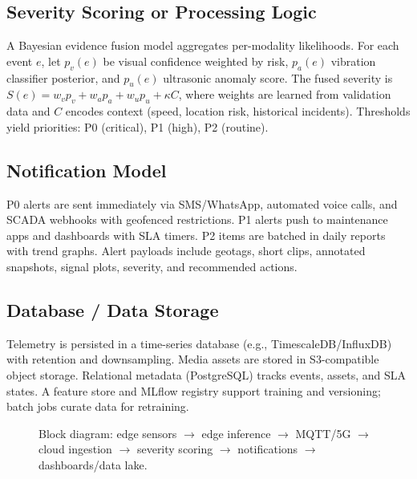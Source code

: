 \documentclass[conference]{IEEEtran}
\begin{document}
\subsection{Severity Scoring or Processing Logic}
A Bayesian evidence fusion model aggregates per-modality likelihoods. For each event $e$, let $p_v(e)$ be visual confidence weighted by risk, $p_a(e)$ vibration classifier posterior, and $p_u(e)$ ultrasonic anomaly score. The fused severity is $S(e)=w_v p_v + w_a p_a + w_u p_u + \kappa C$, where weights are learned from validation data and $C$ encodes context (speed, location risk, historical incidents). Thresholds yield priorities: P0 (critical), P1 (high), P2 (routine).

\subsection{Notification Model}
P0 alerts are sent immediately via SMS/WhatsApp, automated voice calls, and SCADA webhooks with geofenced restrictions. P1 alerts push to maintenance apps and dashboards with SLA timers. P2 items are batched in daily reports with trend graphs. Alert payloads include geotags, short clips, annotated snapshots, signal plots, severity, and recommended actions.

\subsection{Database / Data Storage}
Telemetry is persisted in a time-series database (e.g., TimescaleDB/InfluxDB) with retention and downsampling. Media assets are stored in S3-compatible object storage. Relational metadata (PostgreSQL) tracks events, assets, and SLA states. A feature store and MLflow registry support training and versioning; batch jobs curate data for retraining.

\begin{figure}[t]
\centering
{}
\caption{Block diagram: edge sensors $\rightarrow$ edge inference $\rightarrow$ MQTT/5G $\rightarrow$ cloud ingestion $\rightarrow$ severity scoring $\rightarrow$ notifications $\rightarrow$ dashboards/data lake.}
\label{fig:architecture}
\end{figure}
\end{document}
